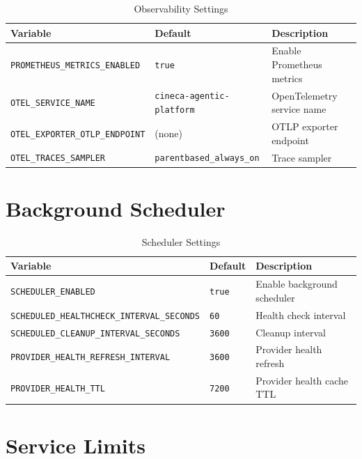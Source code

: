 \begin{table}[ht]
\centering
\caption{Observability Settings}
\label{tab:config-observability}
\small
\begin{tabularx}{\textwidth}{llX}
    \hline
    \textbf{Variable} & \textbf{Default} & \textbf{Description} \\
    \hline
    \texttt{PROMETHEUS\_METRICS\_ENABLED} & \texttt{true} & Enable Prometheus metrics \\
    \texttt{OTEL\_SERVICE\_NAME} & \texttt{cineca-agentic-platform} & OpenTelemetry service name \\
    \texttt{OTEL\_EXPORTER\_OTLP\_ENDPOINT} & (none) & OTLP exporter endpoint \\
    \texttt{OTEL\_TRACES\_SAMPLER} & \texttt{parentbased\_always\_on} & Trace sampler \\
    \hline
\end{tabularx}
\end{table}

\section{Background Scheduler}
\label{app:config:scheduler}

\begin{table}[ht]
\centering
\caption{Scheduler Settings}
\label{tab:config-scheduler}
\small
\begin{tabularx}{\textwidth}{llX}
    \hline
    \textbf{Variable} & \textbf{Default} & \textbf{Description} \\
    \hline
    \texttt{SCHEDULER\_ENABLED} & \texttt{true} & Enable background scheduler \\
    \texttt{SCHEDULED\_HEALTHCHECK\_INTERVAL\_SECONDS} & \texttt{60} & Health check interval \\
    \texttt{SCHEDULED\_CLEANUP\_INTERVAL\_SECONDS} & \texttt{3600} & Cleanup interval \\
    \texttt{PROVIDER\_HEALTH\_REFRESH\_INTERVAL} & \texttt{3600} & Provider health refresh \\
    \texttt{PROVIDER\_HEALTH\_TTL} & \texttt{7200} & Provider health cache TTL \\
    \hline
\end{tabularx}
\end{table}

\section{Service Limits}
\label{app:config:limits}

